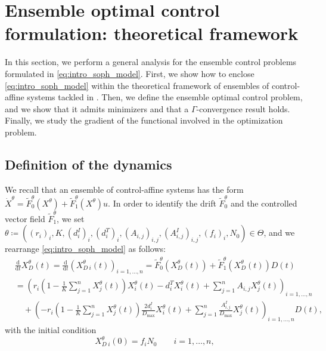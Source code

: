 \documentclass[a4paper,12pt, reqno]{amsart}
\theoremstyle{plain}
\theoremstyle{definition}
\theoremstyle{remark}
\numberwithin{equation}{section}
\begin{document}
\section{Ensemble optimal control formulation: theoretical framework}
\label{sec:theory}

In this section, we perform a general analysis for the ensemble control problems formulated in \cref{eq:intro_soph_model}.
First, we show how to enclose \cref{eq:intro_soph_model} within the theoretical framework of ensembles of control-affine systems tackled in \cite{Scag23,Scag25}.
Then, we define the ensemble optimal control problem, and we show that it admits minimizers and that a $\Gamma$-convergence result holds.
Finally, we study the gradient of the functional involved in the optimization problem.

\subsection{Definition of the dynamics} \label{subsec:theoretical_dyn}
We recall that an ensemble of control-affine systems has the form $\dot X^\theta = \tilde F_0^\theta(X^\theta) + \tilde F_1^\theta(X^\theta)u$.
In order to identify the drift $\tilde F_0^\theta$ and the controlled vector field $\tilde F_1^\theta$, we set {$\theta \coloneqq \left( (r_i)_{i}, K, (d^I_i)_{i}, (d^T_i)_{i},  (A_{i,j})_{i,j} , (A_{i,j}^I)_{i,j}, (f_i)_i, N_0 \right) \in \Theta$}, and we rearrange \cref{eq:intro_soph_model} as follows:
\begin{equation} \label{eq:aff_ctrl_sys}
    \begin{split}
    &\frac{\mathrm{d}}{\mathrm{d}t} X_D^\theta(t)= \frac{\mathrm{d}}{\mathrm{d}t}
    \left( X_{D\ i}^\theta(t)
    \right)_{i=1,\ldots,n}
    = \tilde F_0^\theta\left(X_D^\theta(t)\right)
        +
        \tilde F_1^\theta\left(X_D^\theta(t)\right) D(t)
    \\
    &= \left( { \textstyle
    r_i \left( 1- \frac1K \sum_{j=1}^n X_j^\theta(t) \right)   X_i^\theta(t) - d_i^T X_i^\theta(t)  + \sum_{j=1}^n  A_{i,j} X_j^\theta(t) }
    \right)_{i=1,\ldots,n}\\
    &\quad + 
    \left( { \textstyle
    -r_i \left( 1- \frac1K \sum_{j=1}^n X_j^\theta(t) \right)   \frac{2d_i^I}{D_{\max}} X_i^\theta(t)   + \sum_{j=1}^n\frac{A^I_{i,j}}{D_{\max}} X_j^\theta(t) }
    \right)_{i=1,\ldots,n} D(t),
    \end{split}
\end{equation}
with the initial condition
\begin{equation} \label{eq:Cau_aff_ctrl}
    X^\theta_{D\ i}(0) = f_i N_0 \qquad i=1,\ldots,n,
\end{equation}
\end{document}
